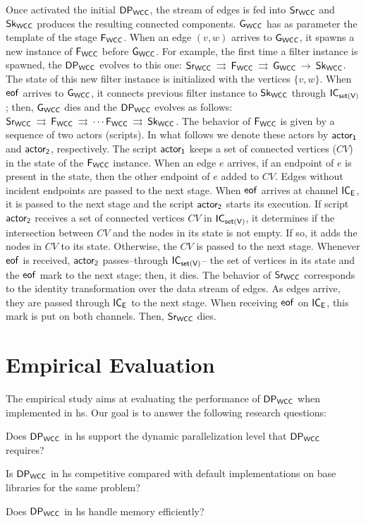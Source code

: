  Once activated the initial $\mathsf{DP_{WCC}}$, the stream of edges is fed into $\mathsf{Sr_{WCC}}$ and $\mathsf{Sk_{WCC}}$ produces the resulting connected components. $\mathsf{G_{WCC}}$ has as parameter the template of the stage  $\mathsf{F_{WCC}}$. When an edge $(v,w)$ arrives to $\mathsf{G_{WCC}}$, it  spawns a new instance of $\mathsf{F_{WCC}}$ before $\mathsf{G_{WCC}}$. For example, the first time a filter instance is spawned, the $\mathsf{DP_{WCC}}$ evolves to this one: $\mathsf{Sr_{WCC}} \:\rightrightarrows\: \mathsf{F_{WCC}} \:\rightrightarrows\: \mathsf{G_{WCC}} \:\rightarrow \: \mathsf{Sk_{WCC}}$. The state of this new filter instance is initialized with the vertices $\{v,w\}$. When $\mathsf{eof}$ arrives to $\mathsf{G_{WCC}}$, it connects previous filter instance to $\mathsf{Sk_{WCC}}$ through $\mathsf{IC_{set(V)}}$; then, $\mathsf{G_{WCC}}$ dies and the $\mathsf{DP_{WCC}}$ evolves as follows: $\mathsf{Sr_{WCC}} \:\rightrightarrows\: \mathsf{F_{WCC}} \:\rightrightarrows\: \cdots \mathsf{F_{WCC}} \:\rightrightarrows \: \mathsf{Sk_{WCC}}$. The behavior of $\mathsf{F_{WCC}}$ is given by a sequence of two actors (scripts). In what follows we denote these actors by $\mathsf{actor_1}$ and $\mathsf{actor_2}$, respectively. The script $\mathsf{actor_1}$ keeps a set of connected vertices ($CV$) in the state of the $\mathsf{F_{WCC}}$ instance. When an edge $e$ arrives, if an endpoint of $e$ is present in the state, then the other endpoint of $e$ added to $CV$.  Edges without incident endpoints are passed to the next stage. When $\mathsf{eof}$ arrives at channel $\mathsf{IC_E}$, it is passed to the next stage and the script $\mathsf{actor_2}$ starts its execution.  If script $\mathsf{actor_2}$ receives a set of connected vertices $CV$ in $\mathsf{IC_{set(V)}}$, it determines if the intersection between $CV$ and the nodes in its state is not empty. If so, it adds the nodes in $CV$  to its state. Otherwise, the $CV$ is passed to the next stage.  Whenever $\mathsf{eof}$ is received, $\mathsf{actor_2}$ passes--through $\mathsf{IC_{set(V)}}$-- the set of vertices in its state and the $\mathsf{eof}$ mark to the next stage; then, it dies.
 The behavior of $\mathsf{Sr_{WCC}}$ corresponds to  the identity transformation over the data stream of edges.  As edges arrive, they are passed through  $\mathsf{IC_E}$ to the next stage. When receiving $\mathsf{eof}$ on $\mathsf{IC_E}$, this mark is put on both channels. Then, $\mathsf{Sr_{WCC}}$ dies. 


\section{Empirical Evaluation}
The empirical study aims at evaluating the performance of $\mathsf{DP_{WCC}}$ when implemented in \acrshort{hs}. 
Our goal is to answer the following research questions: 

\begin{inparaenum}[\bf {\bf RQ}1\upshape)]
\label{res:question}
    \item Does $\mathsf{DP_{WCC}}$ in \acrshort{hs} support the dynamic parallelization level that $\mathsf{DP_{WCC}}$ requires?
    \item Is $\mathsf{DP_{WCC}}$ in \acrshort{hs} competitive compared with default implementations on base libraries for the same problem?
    \item Does $\mathsf{DP_{WCC}}$ in \acrshort{hs} handle memory efficiently?
\end{inparaenum}

